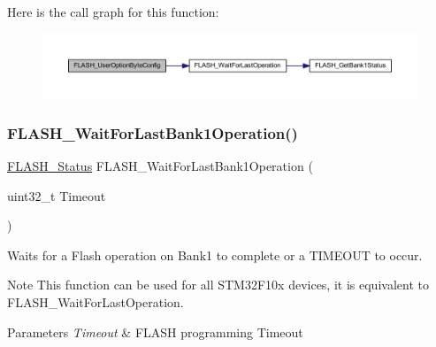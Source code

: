 Here is the call graph for this function\+:
\nopagebreak
\begin{figure}[H]
\begin{center}
\leavevmode
\includegraphics[width=350pt]{group___f_l_a_s_h___private___functions_gaae1c493bb06c930ceb84dedfdb7325f6_cgraph}
\end{center}
\end{figure}
\mbox{\label{group___f_l_a_s_h___private___functions_ga470d345c2ea4304f899aa988bdd23824}} 
\subsubsection{\texorpdfstring{F\+L\+A\+S\+H\+\_\+\+Wait\+For\+Last\+Bank1\+Operation()}{FLASH\_WaitForLastBank1Operation()}}
{\footnotesize\ttfamily \hyperlink{group___f_l_a_s_h___exported___types_gadc63a6f3404ff1f71229a66915e9cdc0}{F\+L\+A\+S\+H\+\_\+\+Status} F\+L\+A\+S\+H\+\_\+\+Wait\+For\+Last\+Bank1\+Operation (\begin{DoxyParamCaption}\item[{uint32\+\_\+t}]{Timeout }\end{DoxyParamCaption})}



Waits for a Flash operation on Bank1 to complete or a T\+I\+M\+E\+O\+UT to occur. 

\begin{DoxyNote}{Note}
This function can be used for all S\+T\+M32\+F10x devices, it is equivalent to F\+L\+A\+S\+H\+\_\+\+Wait\+For\+Last\+Operation. 
\end{DoxyNote}

\begin{DoxyParams}{Parameters}
{\em Timeout} & F\+L\+A\+SH programming Timeout \\
\hline
\end{DoxyParams}

